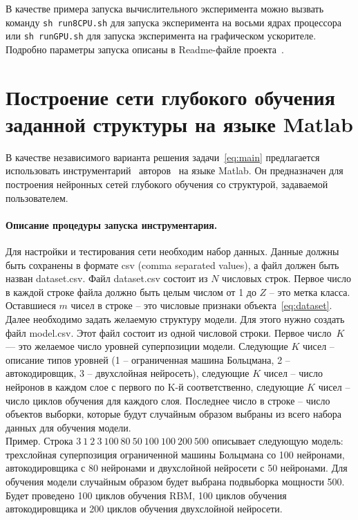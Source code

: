 \documentclass[12pt,notitlepage]{article}
\begin{document}
В качестве примера запуска вычислительного эксперимента можно вызвать команду
\texttt{sh run8CPU.sh}
для запуска эксперимента на восьми ядрах процессора или 
\texttt{sh runGPU.sh}
для запуска эксперимента на графическом ускорителе. Подробно параметры запуска описаны в Readme-файле проекта~\cite{svn}.
\section{Построение сети глубокого обучения заданной структуры на языке Matlab}
В качестве независимого варианта решения задачи~\eqref{eq:main} предлагается использовать инструментарий~\cite{source_popova} авторов~\cite{ts3} на языке Matlab. Он предназначен для построения нейронных сетей глубокого обучения со структурой, задаваемой пользователем. 
\paragraph{Описание процедуры запуска инструментария.} Для настройки и тестирования сети необходим набор данных. Данные должны быть сохранены в формате csv (comma separated values), а файл должен быть назван dataset.csv. Файл dataset.csv состоит из $N$ числовых строк. Первое число в каждой строке файла должно быть целым числом от 1 до $Z$ -- это метка класса. Оставшиеся $m$ чисел в строке -- это числовые признаки объекта~\eqref{eq:dataset}. Далее необходимо задать желаемую структуру модели. Для этого нужно создать файл model.csv. Этот файл состоит из одной числовой строки. Первое число~$K$ --- это желаемое число уровней суперпозиции модели. Следующие $K$ чисел -- описание типов уровней (1 -- ограниченная машина Больцмана, 2 -- автокодировщик, 3 -- двухслойная нейросеть), следующие $K$ чисел -- число нейронов в каждом слое с первого по K-й соответственно, следующие $K$ чисел -- число циклов обучения для каждого слоя. Последнее число в строке -- число объектов выборки, которые будут случайным образом выбраны из всего набора данных для обучения модели. \\

Пример. Строка $3~1~2~3~100~80~50~100~100~200~500$ описывает следующую модель: трехслойная суперпозиция ограниченной машины Больцмана со 100 нейронами, автокодировщика с 80 нейронами и двухслойной нейросети с 50 нейронами. Для обучения модели случайным образом будет выбрана подвыборка мощности 500. Будет проведено 100 циклов обучения RBM, 100 циклов обучения автокодировщика и 200 циклов обучения двухслойной нейросети.\\
\end{document}
